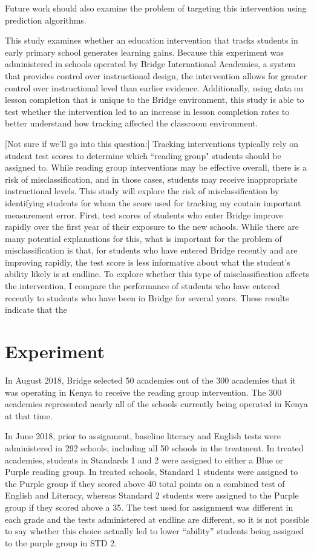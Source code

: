 \documentclass[10pt]{article}
\begin{document}
Future work should also examine the problem of targeting this intervention using prediction algorithms.



This study examines whether an education intervention that tracks students in early primary school generates learning gains. Because this experiment was administered in schools operated by Bridge International Academies, a system that provides control over instructional design, the intervention allows for greater control over instructional level than earlier evidence. Additionally, using data on lesson completion that is unique to the Bridge environment, this study is able to test whether the intervention led to an increase in lesson completion rates to better understand how tracking affected the classroom environment. 

[Not sure if we'll go into this question:]
Tracking interventions typically rely on student test scores to determine which ``reading group" students should be assigned to. While reading group interventions may be effective overall, there is a risk of misclassification, and in those cases, students may receive inappropriate instructional levels. This study will explore the risk of misclassification by identifying students for whom the score used for tracking my contain important measurement error. First, test scores of students who enter Bridge improve rapidly over the first year of their exposure to the new schools. While there are many potential explanations for this, what is important for the problem of misclassification is that, for students who have entered Bridge recently and are improving rapidly, the test score is less informative about what the student's ability likely is at endline. To explore whether this type of misclassification affects the intervention, I compare the performance of students who have entered recently to students who have been in Bridge for several years. These results indicate that the 

\section{Experiment}

In August 2018, Bridge selected 50 academies out of the 300 academies that it was operating in Kenya to receive the reading group intervention.  The 300 academies represented nearly all of the schools currently being operated in Kenya at that time. 

In June 2018, prior to assignment, baseline literacy and English tests were administered in 292 schools, including all 50 schools in the treatment. In treated academies, students in Standards 1 and 2 were assigned to either a Blue or Purple reading group. In treated schools, Standard 1 students were assigned to the Purple group if they scored above 40 total points on a combined test of English and Literacy, whereas Standard 2 students were assigned to the Purple group if they scored above a 35. The test used for assignment was different in each grade and the tests administered at endline are different, so it is not possible to say whether this choice actually led to lower ``ability'' students being assigned to the purple group in STD 2.
\end{document}

